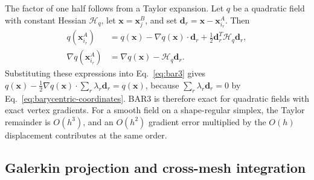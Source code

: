 \documentclass[a4paper,fleqn]{cas-sc}
\begin{document}
The factor of one half follows from a Taylor expansion. Let $q$ be a quadratic field with constant Hessian $\mathcal H_q$, let $\boldsymbol x=\boldsymbol x_j^B$, and set $\boldsymbol d_r=\boldsymbol x-\boldsymbol x_{i_r}^A$. Then
\begin{align*}
q(\boldsymbol x_{i_r}^A)&=q(\boldsymbol x)-\nabla q(\boldsymbol x)\cdot\boldsymbol d_r+\tfrac12\boldsymbol d_r^T\mathcal H_q\boldsymbol d_r,\\
\nabla q(\boldsymbol x_{i_r}^A)&=\nabla q(\boldsymbol x)-\mathcal H_q\boldsymbol d_r.
\end{align*}
Substituting these expressions into Eq.~\eqref{eq:bar3} gives $q(\boldsymbol x)-\tfrac12\nabla q(\boldsymbol x)\cdot\sum_r\lambda_r\boldsymbol d_r=q(\boldsymbol x)$, because $\sum_r\lambda_r\boldsymbol d_r=0$ by Eq.~\eqref{eq:barycentric-coordinates}. BAR3 is therefore exact for quadratic fields with exact vertex gradients. For a smooth field on a shape-regular simplex, the Taylor remainder is $O(h^3)$, and an $O(h^2)$ gradient error multiplied by the $O(h)$ displacement contributes at the same order.

\subsection{Galerkin projection and cross-mesh integration}
\label{sec:galerkin-projection}
\label{sec:simplicial-representation}
\end{document}
